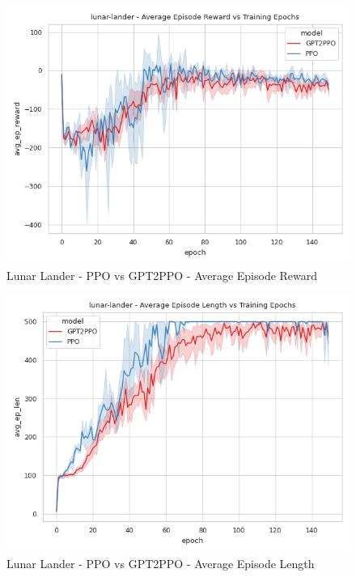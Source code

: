 \begin{figure}[htbp]
    \centerline{\includegraphics[width=\columnwidth]{./img/lunar-lander-avg_ep_reward-model.png}}
    \caption{Lunar Lander - PPO vs GPT2PPO - Average Episode Reward}
    \label{lunar-lander-avg_ep_reward-model}
\end{figure}

\begin{figure}[htbp]
    \centerline{\includegraphics[width=\columnwidth]{./img/lunar-lander-avg_ep_len-model.png}}
    \caption{Lunar Lander - PPO vs GPT2PPO - Average Episode Length}
    \label{lunar-lander-avg_ep_len-model}
\end{figure}



